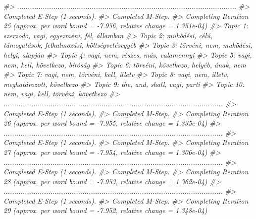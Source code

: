 \documentclass[
]{book}
\newenvironment{Shaded}{\begin{snugshade}}{\end{snugshade}}
\newcommand{\CommentTok}[1]{\textcolor[rgb]{0.56,0.35,0.01}{\textit{#1}}}
\begin{document}
\begin{Shaded}
\begin{Highlighting}[]
\CommentTok{\#\textgreater{} .......................................................................................................}
\CommentTok{\#\textgreater{} Completed E{-}Step (1 seconds). }
\CommentTok{\#\textgreater{} Completed M{-}Step. }
\CommentTok{\#\textgreater{} Completing Iteration 25 (approx. per word bound = {-}7.956, relative change = 1.351e{-}04) }
\CommentTok{\#\textgreater{} Topic 1: szerzodo, vagi, egyezméni, fél, államban }
\CommentTok{\#\textgreater{}  Topic 2: muködési, célú, támogatások, felhalmozási, költségvetésegyéb }
\CommentTok{\#\textgreater{}  Topic 3: törvéni, nem, muködési, helyi, alapján }
\CommentTok{\#\textgreater{}  Topic 4: vagi, nem, részes, más, valamennyi }
\CommentTok{\#\textgreater{}  Topic 5: vagi, nem, kell, következo, bíróság }
\CommentTok{\#\textgreater{}  Topic 6: törvéni, következo, helyéb, ának, nem }
\CommentTok{\#\textgreater{}  Topic 7: vagi, nem, törvéni, kell, illetv }
\CommentTok{\#\textgreater{}  Topic 8: vagi, nem, illetv, meghatározott, következo }
\CommentTok{\#\textgreater{}  Topic 9: the, and, shall, vagi, parti }
\CommentTok{\#\textgreater{}  Topic 10: nem, vagi, kell, törvéni, következo }
\CommentTok{\#\textgreater{} .......................................................................................................}
\CommentTok{\#\textgreater{} Completed E{-}Step (1 seconds). }
\CommentTok{\#\textgreater{} Completed M{-}Step. }
\CommentTok{\#\textgreater{} Completing Iteration 26 (approx. per word bound = {-}7.955, relative change = 1.335e{-}04) }
\CommentTok{\#\textgreater{} .......................................................................................................}
\CommentTok{\#\textgreater{} Completed E{-}Step (1 seconds). }
\CommentTok{\#\textgreater{} Completed M{-}Step. }
\CommentTok{\#\textgreater{} Completing Iteration 27 (approx. per word bound = {-}7.954, relative change = 1.306e{-}04) }
\CommentTok{\#\textgreater{} .......................................................................................................}
\CommentTok{\#\textgreater{} Completed E{-}Step (1 seconds). }
\CommentTok{\#\textgreater{} Completed M{-}Step. }
\CommentTok{\#\textgreater{} Completing Iteration 28 (approx. per word bound = {-}7.953, relative change = 1.362e{-}04) }
\CommentTok{\#\textgreater{} .......................................................................................................}
\CommentTok{\#\textgreater{} Completed E{-}Step (1 seconds). }
\CommentTok{\#\textgreater{} Completed M{-}Step. }
\CommentTok{\#\textgreater{} Completing Iteration 29 (approx. per word bound = {-}7.952, relative change = 1.348e{-}04) }

\end{Highlighting}
\end{Shaded}
\end{document}

